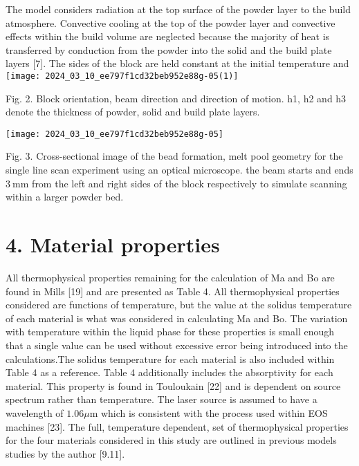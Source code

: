 \documentclass[10pt]{article}
\begin{document}
The model considers radiation at the top surface of the powder layer to the build atmosphere. Convective cooling at the top of the powder layer and convective effects within the build volume are neglected because the majority of heat is transferred by conduction from the powder into the solid and the build plate layers [7]. The sides of the block are held constant at the initial temperature and\\
\texttt{[image: 2024\_03\_10\_ee797f1cd32beb952e88g-05(1)]}

Fig. 2. Block orientation, beam direction and direction of motion. h1, h2 and h3 denote the thickness of powder, solid and build plate layers.

\begin{center}
\texttt{[image: 2024\_03\_10\_ee797f1cd32beb952e88g-05]}
\end{center}

Fig. 3. Cross-sectional image of the bead formation, melt pool geometry for the single line scan experiment using an optical microscope. the beam starts and ends $3 \mathrm{~mm}$ from the left and right sides of the block respectively to simulate scanning within a larger powder bed.

\section*{4. Material properties}
All thermophysical properties remaining for the calculation of Ma and Bo are found in Mills [19] and are presented as Table 4. All thermophysical properties considered are functions of temperature, but the value at the solidus temperature of each material is what was considered in calculating Ma and Bo. The variation with temperature within the liquid phase for these properties is small enough that a single value can be used without excessive error being introduced into the calculations.The solidus temperature for each material is also included within Table 4 as a reference. Table 4 additionally includes the absorptivity for each material. This property is found in Touloukain [22] and is dependent on source spectrum rather than temperature. The laser source is assumed to have a wavelength of $1.06 \mu \mathrm{m}$ which is consistent with the process used within EOS machines [23]. The full, temperature dependent, set of thermophysical properties for the four materials considered in this study are outlined in previous models studies by the author [9.11].
\end{document}
